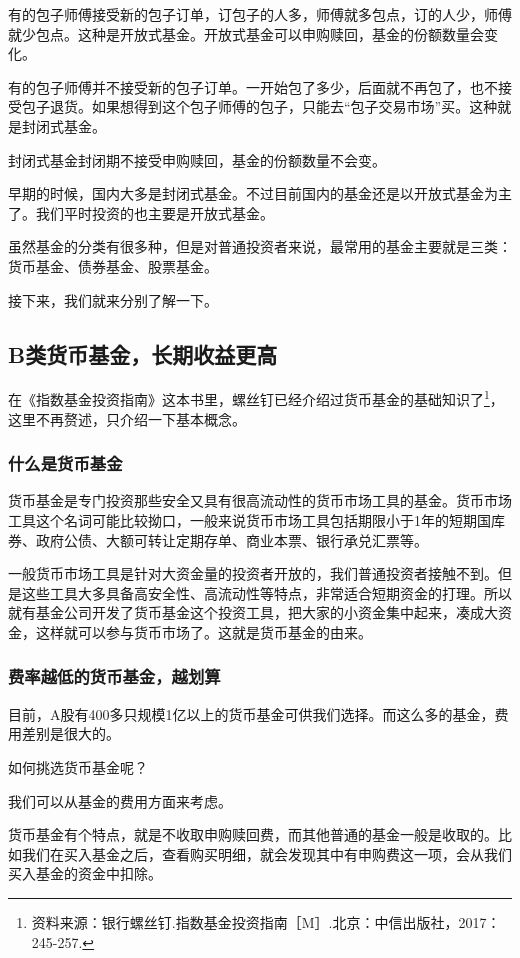 有的包子师傅接受新的包子订单，订包子的人多，师傅就多包点，订的人少，师傅就少包点。这种是开放式基金。开放式基金可以申购赎回，基金的份额数量会变化。

有的包子师傅并不接受新的包子订单。一开始包了多少，后面就不再包了，也不接受包子退货。如果想得到这个包子师傅的包子，只能去“包子交易市场”买。这种就是封闭式基金。

封闭式基金封闭期不接受申购赎回，基金的份额数量不会变。

早期的时候，国内大多是封闭式基金。不过目前国内的基金还是以开放式基金为主了。我们平时投资的也主要是开放式基金。

虽然基金的分类有很多种，但是对普通投资者来说，最常用的基金主要就是三类：货币基金、债券基金、股票基金。

接下来，我们就来分别了解一下。

\subsection{B类货币基金，长期收益更高}
在《指数基金投资指南》这本书里，螺丝钉已经介绍过货币基金的基础知识了\footnote{资料来源：银行螺丝钉.指数基金投资指南［M］.北京：中信出版社，2017：245-257.}，这里不再赘述，只介绍一下基本概念。

\subsubsection{什么是货币基金}

货币基金是专门投资那些安全又具有很高流动性的货币市场工具的基金。货币市场工具这个名词可能比较拗口，一般来说货币市场工具包括期限小于1年的短期国库券、政府公债、大额可转让定期存单、商业本票、银行承兑汇票等。

一般货币市场工具是针对大资金量的投资者开放的，我们普通投资者接触不到。但是这些工具大多具备高安全性、高流动性等特点，非常适合短期资金的打理。所以就有基金公司开发了货币基金这个投资工具，把大家的小资金集中起来，凑成大资金，这样就可以参与货币市场了。这就是货币基金的由来。

\subsubsection{费率越低的货币基金，越划算}

目前，A股有400多只规模1亿以上的货币基金可供我们选择。而这么多的基金，费用差别是很大的。

如何挑选货币基金呢？

我们可以从基金的费用方面来考虑。

货币基金有个特点，就是不收取申购赎回费，而其他普通的基金一般是收取的。比如我们在买入基金之后，查看购买明细，就会发现其中有申购费这一项，会从我们买入基金的资金中扣除。

